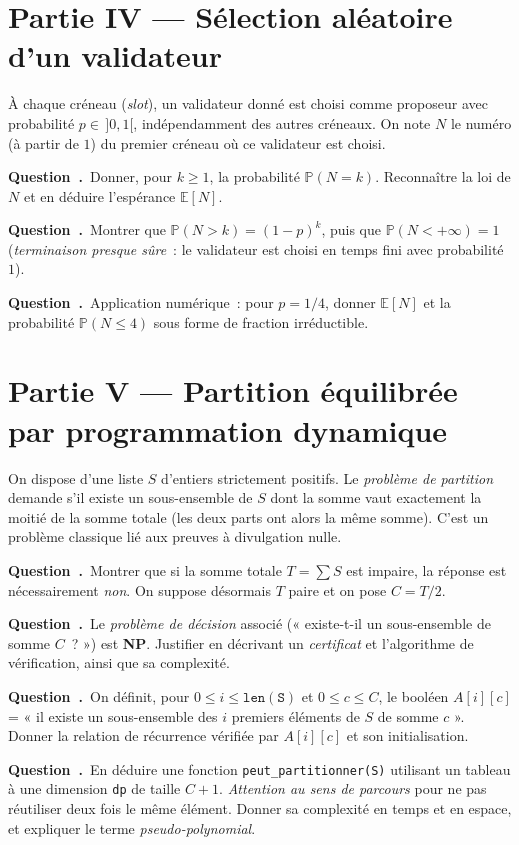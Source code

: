 \documentclass[11pt,a4paper]{article}
\newcounter{qcnt}
\newcommand{\Q}{\medskip\par\stepcounter{qcnt}\noindent\textbf{Question~\theqcnt.}~}
\newcommand{\code}[1]{\lstinline!#1!}
\begin{document}
\section*{Partie IV --- Sélection aléatoire d'un validateur}

À chaque créneau (\emph{slot}), un validateur donné est choisi comme proposeur avec probabilité
$p \in\, ]0,1[$, indépendamment des autres créneaux. On note $N$ le numéro (à partir de $1$) du
premier créneau où ce validateur est choisi.

\Q Donner, pour $k \ge 1$, la probabilité $\mathbb{P}(N = k)$. Reconnaître la loi de $N$ et en
déduire l'espérance $\mathbb{E}[N]$.

\Q Montrer que $\mathbb{P}(N > k) = (1-p)^{k}$, puis que $\mathbb{P}(N < +\infty) = 1$
(\emph{terminaison presque sûre}~: le validateur est choisi en temps fini avec probabilité $1$).

\Q Application numérique~: pour $p = 1/4$, donner $\mathbb{E}[N]$ et la probabilité
$\mathbb{P}(N \le 4)$ sous forme de fraction irréductible.

\section*{Partie V --- Partition équilibrée par programmation dynamique}

On dispose d'une liste $S$ d'entiers strictement positifs. Le \emph{problème de partition}
demande s'il existe un sous-ensemble de $S$ dont la somme vaut exactement la moitié de la somme
totale (les deux parts ont alors la même somme). C'est un problème classique lié aux preuves à
divulgation nulle.

\Q Montrer que si la somme totale $T = \sum S$ est impaire, la réponse est nécessairement
\emph{non}. On suppose désormais $T$ paire et on pose $C = T/2$.

\Q Le \emph{problème de décision} associé (« existe-t-il un sous-ensemble de somme $C$~? ») est
\textbf{NP}. Justifier en décrivant un \emph{certificat} et l'algorithme de vérification, ainsi
que sa complexité.

\Q On définit, pour $0 \le i \le \mathtt{len(S)}$ et $0 \le c \le C$, le booléen $A[i][c]$ = « il
existe un sous-ensemble des $i$ premiers éléments de $S$ de somme $c$ ». Donner la relation de
récurrence vérifiée par $A[i][c]$ et son initialisation.

\Q En déduire une fonction \code{peut_partitionner(S)} utilisant un tableau à une dimension
\code{dp} de taille $C+1$. \emph{Attention au sens de parcours} pour ne pas réutiliser deux fois
le même élément. Donner sa complexité en temps et en espace, et expliquer le terme
\emph{pseudo-polynomial}.
\end{document}
